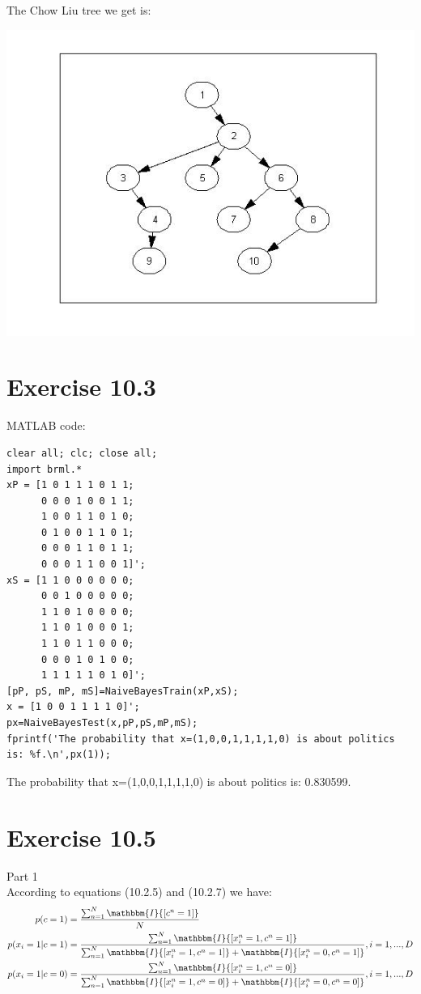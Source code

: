 \documentclass[11pt,a4paper,oneside]{report}
\begin{document}
The Chow Liu tree we get is:

	\begin{center} \includegraphics[width=1\textwidth]{c9e13chowliutree}\end{center}

\section*{Exercise 10.3}
MATLAB code:
\begin{lstlisting}
clear all; clc; close all;
import brml.*
xP = [1 0 1 1 1 0 1 1;
      0 0 0 1 0 0 1 1;
      1 0 0 1 1 0 1 0;
      0 1 0 0 1 1 0 1;
      0 0 0 1 1 0 1 1;
      0 0 0 1 1 0 0 1]';
xS = [1 1 0 0 0 0 0 0;
      0 0 1 0 0 0 0 0;
      1 1 0 1 0 0 0 0;
      1 1 0 1 0 0 0 1;
      1 1 0 1 1 0 0 0;
      0 0 0 1 0 1 0 0;
      1 1 1 1 1 0 1 0]';
[pP, pS, mP, mS]=NaiveBayesTrain(xP,xS);
x = [1 0 0 1 1 1 1 0]';
px=NaiveBayesTest(x,pP,pS,mP,mS);
fprintf('The probability that x=(1,0,0,1,1,1,1,0) is about politics is: %f.\n',px(1));
\end{lstlisting}

The probability that x=(1,0,0,1,1,1,1,0) is about politics is: 0.830599.

\section*{Exercise 10.5}

Part 1\\
According to equations (10.2.5) and (10.2.7) we have:
\begin{align*}
p(c=1) &=  \frac{\sum_{n=1}^N \mathbbm{I}{[c^n=1]}}{N}\\
p(x_i=1|c=1) &=  \frac{\sum_{n=1}^N \mathbbm{I}{[x_i^n=1,c^n=1]}}{\sum_{n=1}^N \mathbbm{I}{[x_i^n=1,c^n=1]}+\mathbbm{I}{[x_i^n=0,c^n=1]}},i=1,...,D\\
p(x_i=1|c=0) &=  \frac{\sum_{n=1}^N \mathbbm{I}{[x_i^n=1,c^n=0]}}{\sum_{n=1}^N \mathbbm{I}{[x_i^n=1,c^n=0]}+\mathbbm{I}{[x_i^n=0,c^n=0]}},i=1,...,D
\end{align*}
\end{document}
